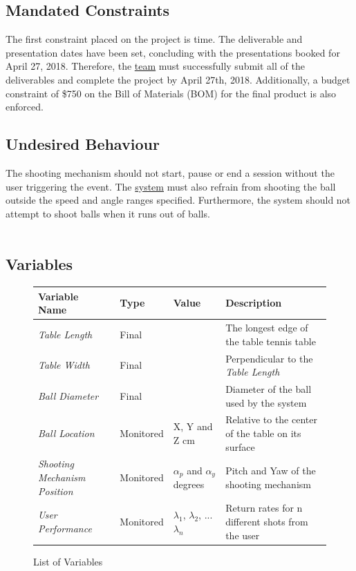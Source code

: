 \documentclass[11pt]{article}
\begin{document}
\subsection{Mandated Constraints}
The first constraint placed on the project is time. The deliverable and presentation dates have been set, concluding with the presentations booked for April 27, 2018. Therefore, the \hyperref[sec:definitions]{team} must successfully submit all of the deliverables and complete the project by April 27th, 2018. Additionally, a budget constraint of \$750 on the Bill of Materials (BOM) for the final product is also enforced.
\subsection{Undesired Behaviour} 
The shooting mechanism should not start, pause or end a session without the user triggering the event. The \hyperref[sec:definitions]{system} must also refrain from shooting the ball outside the speed and angle ranges specified. Furthermore, the system should not attempt to shoot balls when it runs out of balls. \\\\

\subsection{Variables}
\begin{figure}[H]
   \centering
   \noindent\begin{tabularx}{\textwidth}{| >{\centering\arraybackslash}m{} | >{\centering\arraybackslash}m{} | >{\centering\arraybackslash}m{} | >{\centering\arraybackslash}m{} |}
   \hline 
   \textbf{Variable Name} & \textbf{Type} & \textbf{Value} & \textbf{Description} \\ \hline
   \textit{Table Length} & Final & 274cm & The longest edge of the table tennis table \\ \hline
   \textit{Table Width} & Final & 152.5cm & Perpendicular to the \textit{Table Length} \\ \hline
   \textit{Ball Diameter} & Final & 40mm & Diameter of the ball used by the system \\ \hline
   \textit{Ball Location} & Monitored & X, Y and Z cm & Relative to the center of the table on its surface \\ \hline
   \textit{Shooting Mechanism Position} & Monitored & $\alpha_p$ and $\alpha_y$ degrees & Pitch and Yaw of the shooting mechanism \\ \hline
   \textit{User Performance} & Monitored & $\lambda_1$, $\lambda_2$, ... $\lambda_n$ & Return rates for n different shots from the user \\ \hline
 
\end{tabularx}
\caption{List of Variables}
\end{figure}
\end{document}
